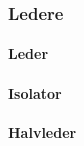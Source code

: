\subsubsection{Ledere}
\paragraph{Leder} \mbox \\

\paragraph{Isolator} \mbox \\

\paragraph{Halvleder} \mbox \\

